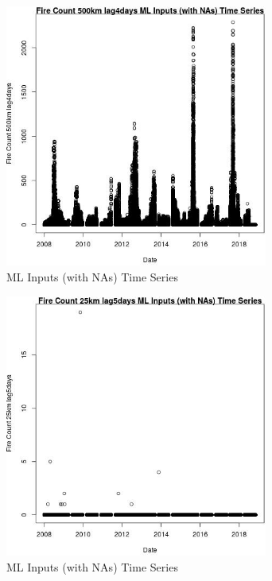 \begin{figure} 
\centering  
\includegraphics[width=0.77\textwidth]{Code_Outputs/Report_ML_input_PM25_Step4_part_e_de_duplicated_aves_compiled_2019-05-20wNAs_Fire_Count_500km_lag4daysvDate.jpg} 
\caption{\label{fig:Report_ML_input_PM25_Step4_part_e_de_duplicated_aves_compiled_2019-05-20wNAsFire_Count_500km_lag4daysvDate}ML Inputs (with NAs) Time Series} 
\end{figure} 
 

\begin{figure} 
\centering  
\includegraphics[width=0.77\textwidth]{Code_Outputs/Report_ML_input_PM25_Step4_part_e_de_duplicated_aves_compiled_2019-05-20wNAs_Fire_Count_25km_lag5daysvDate.jpg} 
\caption{\label{fig:Report_ML_input_PM25_Step4_part_e_de_duplicated_aves_compiled_2019-05-20wNAsFire_Count_25km_lag5daysvDate}ML Inputs (with NAs) Time Series} 
\end{figure} 
 

